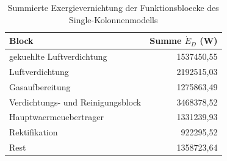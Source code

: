\begin{longtable}{lr}
\caption{Summierte Exergievernichtung der Funktionsbloecke des Single-Kolonnenmodells} \\
\hline
Block & Summe $\dot{E}_D$ (W) \\
\hline
gekuehlte Luftverdichtung & 1537450,55 \\
Luftverdichtung & 2192515,03 \\
Gasaufbereitung & 1275863,49 \\
Verdichtungs- und Reinigungsblock & 3468378,52 \\
Hauptwaermeuebertrager & 1331239,93 \\
Rektifikation & 922295,52 \\
Rest & 1358723,64 \\
\hline
\end{longtable}

